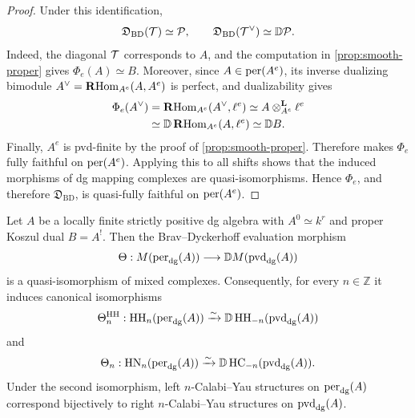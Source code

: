 \documentclass[11pt,a4paper,dvipsnames,x11names]{amsart}
\begin{document}
\begin{proof}
Under this identification,
\[
\mathfrak D_{\mathrm{BD}}(\mathcal T)\simeq\mathcal P,
\qquad
\mathfrak D_{\mathrm{BD}}(\mathcal T^{\vee})\simeq\mathbb D\mathcal P.
\]
Indeed, the diagonal $\mathcal T$ corresponds to $A$, and the computation in \cref{prop:smooth-proper} gives $\Phi_e(A)\simeq B$. Moreover, since $A\in\operatorname{per}(A^e)$, its inverse dualizing bimodule $A^{\vee}=\operatorname{\mathbf{R}Hom}_{A^e}(A,A^e)$ is perfect, and dualizability gives
\[
\begin{aligned}
\Phi_e(A^{\vee})
&=\operatorname{\mathbf{R}Hom}_{A^e}(A^{\vee},\ell^e)\simeq A\otimes_{A^e}^{\mathbf L}\ell^e\\
&\simeq\mathbb D\operatorname{\mathbf{R}Hom}_{A^e}(A,\ell^e)\simeq\mathbb D B.
\end{aligned}
\]
Finally, $A^e$ is pvd-finite by the proof of \cref{prop:smooth-proper}. Therefore \cite[Theorem~D(2)]{Fus24} makes $\Phi_e$ fully faithful on $\operatorname{per}(A^e)$. Applying this to all shifts shows that the induced morphisms of dg mapping complexes are quasi-isomorphisms. Hence $\Phi_e$, and therefore $\mathfrak D_{\mathrm{BD}}$, is quasi-fully faithful on $\operatorname{per}(A^e)$.
\end{proof}

\begin{thm}\label{thm:left-right-CY}
Let $A$ be a locally finite strictly positive dg algebra with $A^0\simeq k^r$ and proper Koszul dual $B=A^!$. Then the Brav--Dyckerhoff evaluation morphism
\[
\Theta:M(\operatorname{per}_{\mathrm{dg}}(A))\longrightarrow\mathbb D M(\operatorname{pvd}_{\mathrm{dg}}(A))
\]
is a quasi-isomorphism of mixed complexes. Consequently, for every $n\in\mathbb Z$ it induces canonical isomorphisms
\begin{equation}\label{eq:left-right-HH}
\Theta_n^{\mathrm{HH}}:\operatorname{HH}_n(\operatorname{per}_{\mathrm{dg}}(A))\xrightarrow{\sim}\mathbb D\operatorname{HH}_{-n}(\operatorname{pvd}_{\mathrm{dg}}(A))
\end{equation}
and
\begin{equation}\label{eq:left-right-HN-HC}
\Theta_n:\operatorname{HN}_n(\operatorname{per}_{\mathrm{dg}}(A))\xrightarrow{\sim}\mathbb D\operatorname{HC}_{-n}(\operatorname{pvd}_{\mathrm{dg}}(A)).
\end{equation}
Under the second isomorphism, left $n$-Calabi--Yau structures on $\operatorname{per}_{\mathrm{dg}}(A)$ correspond bijectively to right $n$-Calabi--Yau structures on $\operatorname{pvd}_{\mathrm{dg}}(A)$.
\end{thm}
\end{document}
